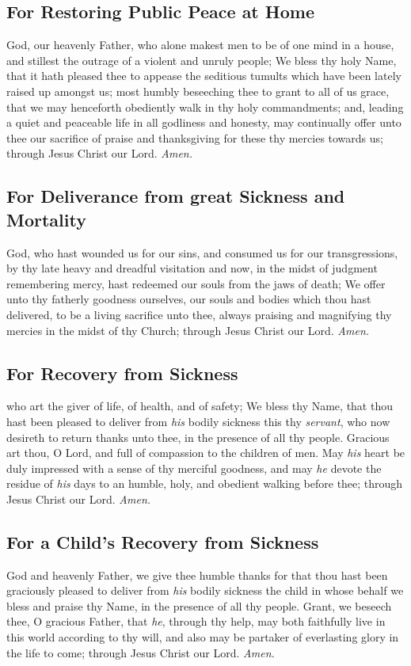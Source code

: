 \subsection{For Restoring Public Peace at Home}
 God, our heavenly Father, who alone makest men to be of one mind in a house, and stillest the outrage of a violent and unruly people; We bless thy holy Name, that it hath pleased thee to appease the seditious tumults which have been lately raised up amongst us; most humbly beseeching thee to grant to all of us grace, that we may henceforth obediently walk in thy holy commandments; and, leading a quiet and peaceable life in all godliness and honesty, may continually offer unto thee our sacrifice of praise and thanksgiving for these thy mercies towards us; through Jesus Christ our Lord. \textit{Amen.}

\subsection{For Deliverance from great Sickness and Mortality}
 God, who hast wounded us for our sins, and consumed us for our transgressions, by thy late heavy and dreadful visitation and now, in the midst of judgment remembering mercy, hast redeemed our souls from the jaws of death; We offer unto thy fatherly goodness ourselves, our souls and bodies which thou hast delivered, to be a living sacrifice unto thee, always praising and magnifying thy mercies in the midst of thy Church; through Jesus Christ our Lord. \textit{Amen.}

\subsection{For Recovery from Sickness}
 who art the giver of life, of health, and of safety; We bless thy Name, that thou hast been pleased to deliver from \textit{his} bodily sickness this thy \textit{servant}, who now desireth to return thanks unto thee, in the presence of all thy people. Gracious art thou, O Lord, and full of compassion to the children of men. May \textit{his} heart be duly impressed with a sense of thy merciful goodness, and may \textit{he} devote the residue of \textit{his} days to an humble, holy, and obedient walking before thee; through Jesus Christ our Lord. \textit{Amen.}

\subsection{For a Child's Recovery from Sickness}
 God and heavenly Father, we give thee humble thanks for that thou hast been graciously pleased to deliver from \textit{his} bodily sickness the child in whose behalf we bless and praise thy Name, in the presence of all thy people. Grant, we beseech thee, O gracious Father, that \textit{he}, through thy help, may both faithfully live in this world according to thy will, and also may be partaker of everlasting glory in the life to come; through Jesus Christ our Lord. \textit{Amen.}

